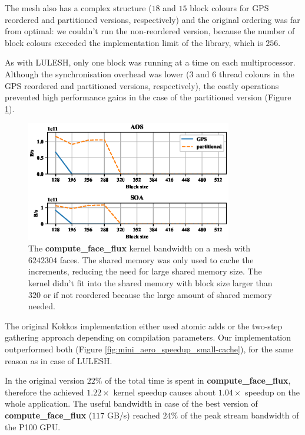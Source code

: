 The mesh also has a complex structure ($18$ and $15$ block colours for GPS
reordered and partitioned versions, respectively) and the original ordering was
far from optimal: we couldn't run the non-reordered version, because the number
of block colours exceeded the implementation limit of the library, which is
$256$.

As with LULESH, only one block was running at a time on each multiprocessor.
Although the synchronisation overhead was lower ($3$ and $6$ thread
colours in the GPS reordered and partitioned versions, respectively), the costly
operations prevented high performance gains in the case of the partitioned
version (Figure \ref{fig:mini_aero_bw_small-cache}).

\begin{figure}[Htbp]
  \centering
  \includegraphics[width=9cm]{fig/mini_aero_bw_small-cache.eps}
  \caption{The \textbf{compute\_face\_flux} kernel bandwidth on a mesh with
  $6242304$ faces. The shared memory was only used to cache the increments,
  reducing the need for large shared memory size. The kernel didn't fit into the
  shared memory with block size larger than $320$ or if not reordered because the
  large amount of shared memory needed.}
  \label{fig:mini_aero_bw_small-cache}
\end{figure}

The original Kokkos implementation either used atomic adds or the two-step
gathering approach depending on compilation parameters. Our implementation
outperformed both (Figure \ref{fig:mini_aero_speedup_small-cache}), for the same
reason as in case of LULESH.

In the original version $22\%$ of the total time is spent in
\textbf{compute\_face\_flux}, therefore the achieved $1.22\times$ kernel speedup
causes about $1.04\times$ speedup on the whole application. The useful bandwidth
in case of the best version of \textbf{compute\_face\_flux} ($117$ GB/s) reached
$24\%$ of the peak stream bandwidth of the P100 GPU.

